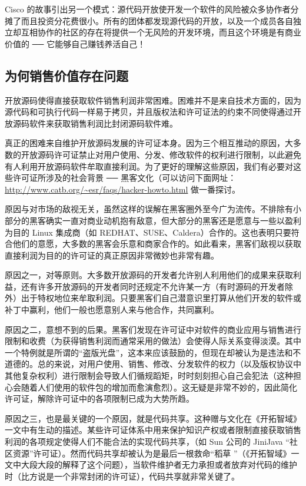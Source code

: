 Cisco 的故事引出另一个模式：源代码开放使开发一个软件的风险被众多协作者分摊了而且投资分花费很小。所有的团体都发现源代码的开放，以及一个成员各自独立却互相协作的社区的存在将提供一个无风险的开发环境，而且这个环境是有商业价值的  ──  它能够自己赚钱养活自己！


\subsection{为何销售价值存在问题}
开放源码使得直接获取软件销售利润非常困难。困难并不是来自技术方面的，因为源代码和可执行代码一样易于拷贝，并且版权法和许可证法的约束不同使得通过开放源码软件来获取销售利润比封闭源码软件难。


真正的困难来自维护开放源码发展的许可证本身。因为三个相互推动的原因，大多数的开放源码许可证禁止对用户使用、分发、修改软件的权利进行限制，以此避免有人利用开放源码软件牟取直接利润。为了更好的理解这些原因，我们有必要对这些许可证所涉及的社会背景 ── 黑客文化（可以访问下面网址：\url{http://www.catb.org/~esr/faqs/hacker-howto.html} 做一番探讨。


原因与对市场的敌视无关，虽然这样的误解在黑客圈外至今广为流传。不排除有小部分的黑客确实一直对商业动机抱有敌意，但大部分的黑客还是愿意与一些以盈利为目的 Linux 集成商（如 REDHAT、SUSE、Caldera）合作的。这也表明只要符合他们的意愿，大多数的黑客会乐意和商家合作的。如此看来，黑客们敌视以获取直接利润为目的的许可证的真正原因非常微妙也非常有趣。


原因之一，对等原则。大多数开放源码的开发者允许别人利用他们的成果来获取利益，还有许多开放源码的开发者同时还规定不允许某一方（有时源码的开发者除外）出于特权地位来牟取利润。只要黑客们自己潜意识里打算从他们开发的软件或补丁中赢利，他们一般也愿意别人来与他合作，共同赢利。


原因之二，意想不到的后果。黑客们发现在许可证中对软件的商业应用与销售进行限制和收费（为获得销售利润而通常采用的做法）会使得人际关系变得淡漠。其中一个特例就是所谓的“盗版光盘”，这本来应该鼓励的，但现在却被认为是违法和不道德的。总的来说，对用户使用、销售、修改、分发软件的权力（以及版权协议中其他复杂权利）进行限制会导致人们循规蹈矩，时时刻刻担心自己会犯法（这种担心会随着人们使用的软件包的增加而愈演愈烈）。这无疑是非常不妙的，因此简化许可证，解除许可证中的各项限制已成为大势所趋。


原因之三，也是最关键的一个原因，就是代码共享。这种赠与文化在《开拓智域》一文中有生动的描述。某些许可证体系中用来保护知识产权或者限制直接获取销售利润的各项规定使得人们不能合法的实现代码共享，（如 Sun 公司的 JiniJava “社区资源”许可证）。然而代码共享却被认为是最后一根救命“稻草 ”（《开拓智域》一文中大段大段的解释了这个问题），当软件维护者无力承担或者放弃对代码的维护时（比方说是一个非常封闭的许可证），代码共享就非常关键了。


